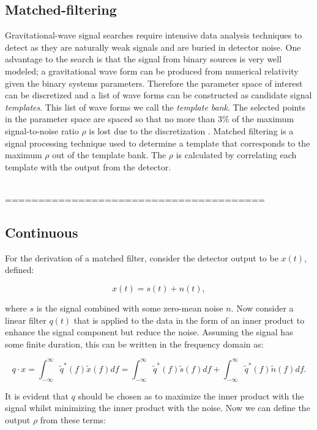 \documentclass[aps,prd,nofootinbib,twocolumn,reprint,superscriptaddress,showpacs,showkeys,longbibliography]{revtex4-1}
\begin{document}
\subsection{Matched-filtering}

Gravitational-wave signal searches require intensive data analysis techniques to detect as they are naturally weak signals and are buried in detector noise.
One advantage to the search is that the signal from binary sources is very well modeled; a gravitational wave form can be produced from numerical relativity given the binary systems parameters. 
Therefore the parameter space of interest can be discretized and a list of wave forms can be constructed as candidate signal \textit{templates}.
This list of wave forms we call the \textit{template bank}.
The selected points in the parameter space are spaced so that no more than $3\%$ of the maximum signal-to-noise ratio $\rho$ is lost due to the discretization \cite{capano2016implementing}.
Matched filtering is a signal processing technique used to determine a template that corresponds to the maximum $\rho$ out of the template bank.
The $\rho$ is calculated by correlating each template with the output from the detector.

\ \\
=======================================
\subsection*{Continuous}

For the derivation of a matched filter, consider the detector output to be $x(t)$, defined:

\begin{equation}
x(t) = s(t) + n(t),
\end{equation}

where $s$ is the signal combined with some zero-mean noise $n$.
Now consider a linear filter $q(t)$ that is applied to the data in the form of an inner product to enhance the signal component but reduce the noise.
Assuming the signal has some finite duration, this can be written in the frequency domain as:

\begin{equation}
q\cdot x = \int_{-\infty}^{\infty} \tilde{q}^{\ast}(f)\tilde{x}(f)df = \int_{-\infty}^{\infty} \tilde{q}^{\ast}(f)\tilde{s}(f)df + \int_{-\infty}^{\infty} \tilde{q}^{\ast}(f)\tilde{n}(f)df.
\end{equation}

It is evident that $q$ should be chosen as to maximize the inner product with the signal whilst minimizing the inner product with the noise.
Now we can define the output $\rho$ from these terms: 
\end{document}
